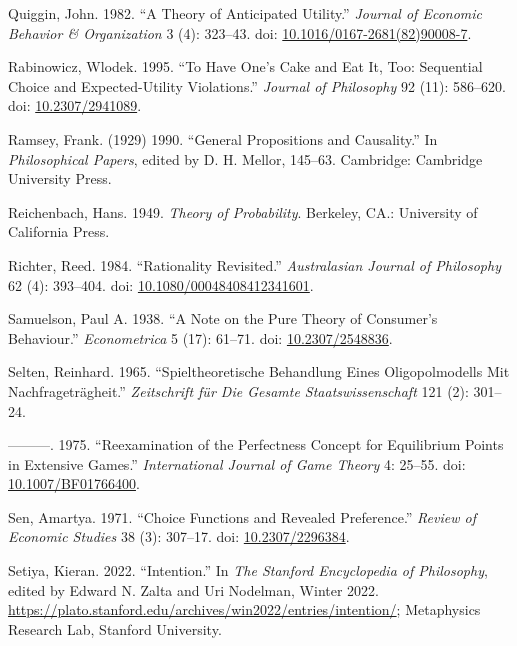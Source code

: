 \documentclass[
  11pt,
  letterpaper,
  DIV=11,
  numbers=noendperiod,
  twoside]{scrartcl}
\newlength{\cslhangindent}
\newenvironment{CSLReferences}[2] %
 {\begin{list}{}{%
  \setlength{\itemindent}{0pt}
  \setlength{\leftmargin}{0pt}
  \setlength{\parsep}{0pt}
  \ifodd #1
   \setlength{\leftmargin}{\cslhangindent}
   \setlength{\itemindent}{-1\cslhangindent}
  \fi
  \setlength{\itemsep}{#2\baselineskip}}}
 {\end{list}}
\begin{document}
\begin{CSLReferences}{1}{0}
Quiggin, John. 1982. {``A Theory of Anticipated Utility.''}
\emph{Journal of Economic Behavior \& Organization} 3 (4): 323--43. doi:
\href{https://doi.org/10.1016/0167-2681(82)90008-7}{10.1016/0167-2681(82)90008-7}.

Rabinowicz, Wlodek. 1995. {``To Have One's Cake and Eat It, Too:
Sequential Choice and Expected-Utility Violations.''} \emph{Journal of
Philosophy} 92 (11): 586--620. doi:
\href{https://doi.org/10.2307/2941089}{10.2307/2941089}.

Ramsey, Frank. (1929) 1990. {``General Propositions and Causality.''} In
\emph{Philosophical Papers}, edited by D. H. Mellor, 145--63. Cambridge:
Cambridge University Press.

Reichenbach, Hans. 1949. \emph{Theory of Probability}. Berkeley, CA.:
University of California Press.

Richter, Reed. 1984. {``Rationality Revisited.''} \emph{Australasian
Journal of Philosophy} 62 (4): 393--404. doi:
\href{https://doi.org/10.1080/00048408412341601}{10.1080/00048408412341601}.

Samuelson, Paul A. 1938. {``A Note on the Pure Theory of Consumer's
Behaviour.''} \emph{Econometrica} 5 (17): 61--71. doi:
\href{https://doi.org/10.2307/2548836}{10.2307/2548836}.

Selten, Reinhard. 1965. {``Spieltheoretische Behandlung Eines
Oligopolmodells Mit Nachfragetr{ä}gheit.''} \emph{Zeitschrift f{ü}r Die
Gesamte Staatswissenschaft} 121 (2): 301--24.

---------. 1975. {``Reexamination of the Perfectness Concept for
Equilibrium Points in Extensive Games.''} \emph{International Journal of
Game Theory} 4: 25--55. doi:
\href{https://doi.org/10.1007/BF01766400}{10.1007/BF01766400}.

Sen, Amartya. 1971. {``Choice Functions and Revealed Preference.''}
\emph{Review of Economic Studies} 38 (3): 307--17. doi:
\href{https://doi.org/10.2307/2296384}{10.2307/2296384}.

Setiya, Kieran. 2022. {``{Intention}.''} In \emph{The {Stanford}
Encyclopedia of Philosophy}, edited by Edward N. Zalta and Uri Nodelman,
{W}inter 2022.
\url{https://plato.stanford.edu/archives/win2022/entries/intention/};
Metaphysics Research Lab, Stanford University.


\end{CSLReferences}
\end{document}
